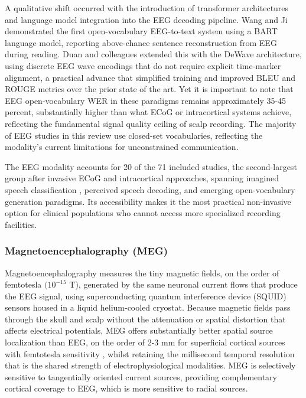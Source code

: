 A qualitative shift occurred with the introduction of transformer architectures and language model integration into the EEG decoding pipeline. Wang and Ji \cite{Wang2022} demonstrated the first open-vocabulary EEG-to-text system using a BART language model, reporting above-chance sentence reconstruction from EEG during reading. Duan and colleagues \cite{Duan2023} extended this with the DeWave architecture, using discrete EEG wave encodings that do not require explicit time-marker alignment, a practical advance that simplified training and improved BLEU and ROUGE metrics over the prior state of the art. Yet it is important to note that EEG open-vocabulary WER in these paradigms remains approximately 35-45 percent, substantially higher than what ECoG or intracortical systems achieve, reflecting the fundamental signal quality ceiling of scalp recording. The majority of EEG studies in this review use closed-set vocabularies, reflecting the modality's current limitations for unconstrained communication.

The EEG modality accounts for 20 of the 71 included studies, the second-largest group after invasive ECoG and intracortical approaches, spanning imagined speech classification \cite{Panachakel2021,LopezBernal2022,Nieto2022}, perceived speech decoding, and emerging open-vocabulary generation paradigms. Its accessibility makes it the most practical non-invasive option for clinical populations who cannot access more specialized recording facilities.

\subsubsection{Magnetoencephalography (MEG)}

Magnetoencephalography measures the tiny magnetic fields, on the order of femtotesla $(10^{-15}$ T), generated by the same neuronal current flows that produce the EEG signal, using superconducting quantum interference device (SQUID) sensors housed in a liquid helium-cooled cryostat. Because magnetic fields pass through the skull and scalp without the attenuation or spatial distortion that affects electrical potentials, MEG offers substantially better spatial source localization than EEG, on the order of 2-3 mm for superficial cortical sources with femtotesla sensitivity \cite{Baillet2001}, whilst retaining the millisecond temporal resolution that is the shared strength of electrophysiological modalities. MEG is selectively sensitive to tangentially oriented current sources, providing complementary cortical coverage to EEG, which is more sensitive to radial sources.

